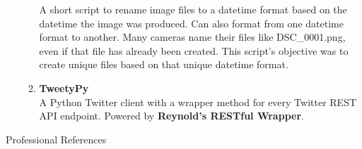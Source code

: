 \documentclass[oneside]{article}%
\begin{document}
\begin{enumerate}[]
\begin{enumerate}[]
				A short script to rename image files to a datetime format based on the datetime the image was produced. Can also format from one datetime format to another. Many cameras name their files like DSC\_0001.png, even if that file has already been created. This script's objective was to create unique files based on that unique datetime format.
			\item \textbf{TweetyPy}\\
				A Python Twitter client with a wrapper method for every Twitter REST API endpoint. Powered by \textbf{Reynold's RESTful Wrapper\textsuperscript{\textcopyright}}.
		\end{enumerate}
\end{enumerate}

\newpage
\noindent
\huge{Professional References}\\
\small
\end{document}

